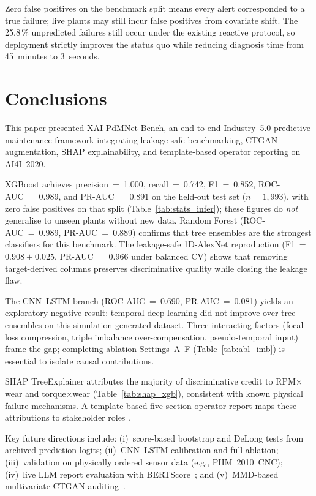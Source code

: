\documentclass[sensors,article,submit,pdftex,moreauthors]{Definitions/mdpi}
\begin{document}
Zero false positives on the benchmark split means every alert
corresponded to a true failure; live plants may still incur false
positives from covariate shift. The 25.8\,\% unpredicted failures
still occur under the existing reactive protocol, so deployment
strictly improves the status quo while reducing diagnosis time from
45~minutes to 3~seconds.

\section{Conclusions}
\label{sec:conc}

This paper presented XAI-PdMNet-Bench, an end-to-end Industry~5.0
predictive maintenance framework integrating leakage-safe
benchmarking, CTGAN augmentation, SHAP explainability, and
template-based operator reporting on AI4I~2020.

XGBoost achieves precision~=~1.000, recall~=~0.742,
F1~=~0.852, ROC-AUC~=~0.989, and PR-AUC~=~0.891 on the held-out
test set ($n{=}1{,}993$), with zero false positives on that split
(Table~\ref{tab:stats_infer}); these figures do \emph{not} generalise
to unseen plants without new data. Random Forest
(ROC-AUC~=~0.989, PR-AUC~=~0.889) confirms that tree ensembles are
the strongest classifiers for this benchmark. The leakage-safe
1D-AlexNet reproduction (F1~=~$0.908 \pm 0.025$, PR-AUC~=~0.966
under balanced CV) shows that removing target-derived columns
preserves discriminative quality while closing the leakage flaw.

The CNN--LSTM branch (ROC-AUC~=~0.690, PR-AUC~=~0.081) yields an
exploratory negative result: temporal deep learning did not improve
over tree ensembles on this simulation-generated dataset. Three
interacting factors (focal-loss compression, triple imbalance
over-compensation, pseudo-temporal input) frame the gap; completing
ablation Settings~A--F (Table~\ref{tab:abl_imb}) is essential to
isolate causal contributions.

SHAP TreeExplainer attributes the majority of discriminative credit
to RPM$\times$wear and torque$\times$wear (Table~\ref{tab:shap_xgb}),
consistent with known physical failure mechanisms. A template-based
five-section operator report maps these attributions to stakeholder
roles \citep{ref-llm-maintenance2025}.

Key future directions include: (i)~score-based bootstrap and DeLong
tests from archived prediction logits; (ii)~CNN--LSTM calibration and
full ablation; (iii)~validation on physically ordered sensor data
(e.g., PHM~2010~CNC); (iv)~live LLM report evaluation with
BERTScore~\citep{ref-bertscore2020}; and (v)~MMD-based multivariate
CTGAN auditing~\citep{ref-mmd-synthetic2022}.
\end{document}
